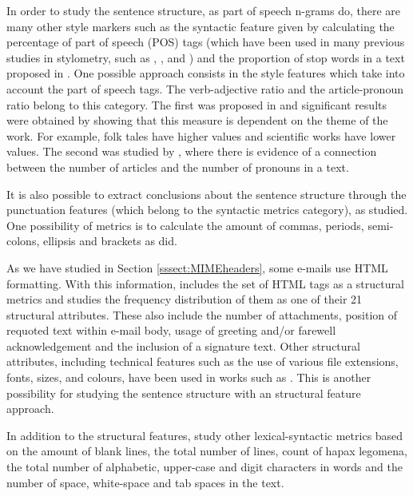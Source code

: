 In order to study the sentence structure, as part of speech n-grams do, there are many other style markers such as the syntactic feature given by calculating the percentage of part of speech (POS) tags (which have been used in many previous studies in stylometry, such as \cite{argamon1998style}, \cite{zhao2007searching}, \cite{ott2011finding} and \cite{cfgstylo}) and the proportion of stop words in a text proposed in \cite{ril2014determination}. One possible approach consists in the style features which take into account the part of speech tags. The verb-adjective ratio and the article-pronoun ratio belong to this category. The first was proposed in \cite{antosch1969diagnosis} and significant results were obtained by showing that this measure is dependent on the theme of the work. For example, folk tales have higher values and scientific works have lower values. The second was studied by \cite{brainerd1974weighting}, where there is evidence of a connection between the number of articles and the number of pronouns in a text.

It is also possible to extract conclusions about the sentence structure through the punctuation features (which belong to the syntactic metrics category), as \cite{baayen2002experiment} studied. One possibility of metrics is to calculate the amount of commas, periods, semi-colons, ellipsis and brackets as \cite{calix2008stylometry} did.

As we have studied in Section \ref{sssect:MIMEheaders}, some e-mails use HTML formatting. With this information, \cite{de2001mining} includes the set of HTML tags as a structural metrics and studies the frequency distribution of them as one of their 21 structural attributes. These also include the number of attachments, position of requoted text within e-mail body, usage of greeting and/or farewell acknowledgement and the inclusion of a signature text. Other structural attributes, including technical features such as the use of various file extensions, fonts, sizes, and colours, have been used in works such as \cite{abbasi2005applying}. This is another possibility for studying the sentence structure with an structural feature approach. 

In addition to the structural features, \cite{de2001mining} study other lexical-syntactic metrics based on the amount of blank lines, the total number of lines, count of hapax legomena, the total number of alphabetic, upper-case and digit characters in words and the number of space, white-space and tab spaces in the text.

